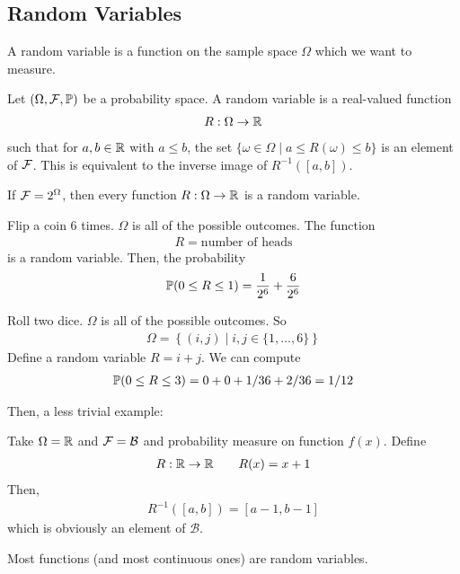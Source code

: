 \subsection{Random Variables}
A random variable is a function on the sample space $\Omega$ which we want to measure.
\begin{definition}
    Let $(\Omega, \mathcal{F}, \mathbb{P})$ be a probability space. A random variable is a real-valued function
    \begin{align}
        R: \Omega \to \mathbb{R}
    \end{align}
    such that for $a,b\in\mathbb{R}$ with $a\le b$, the set $\{ \omega \in \Omega \mid a \le R(\omega) \le b \}$ is an element of $\mathcal{F}$. This is equivalent to the inverse image of $R^{-1}([a,b])$.
\end{definition}
\begin{proposition}
    If $\mathcal{F} = 2^\Omega$, then every function $R: \Omega \to \mathbb{R}$ is a random variable.
\end{proposition}
\begin{example}
    Flip a coin 6 times. $\Omega$ is all of the possible outcomes. The function
    \begin{align}
        R = \text{number of heads}
    \end{align}
    is a random variable. Then, the probability
    \begin{align}
        \mathbb{P}(0 \le R \le 1) = \frac{1}{2^6} + \frac{6}{2^6}
    \end{align}
\end{example}
\begin{example}
    Roll two dice. $\Omega$ is all of the possible outcomes. So
    \begin{align}
        \Omega = \left\{ (i,j) \mid i, j \in \{ 1, \ldots, 6 \} \right\}
    \end{align}
    Define a random variable $R = i + j$. We can compute
    \begin{align}
        \mathbb{P}(0 \le R \le 3) = 0 + 0 + 1/36 + 2/36 = 1/12
    \end{align}
\end{example}
Then, a less trivial example:
\begin{example}
    Take $\Omega = \mathbb{R}$ and $\mathcal{F} = \mathcal{B}$ and probability measure on function $f(x)$. Define
    \begin{align}
        R: \real \to \real \qsp R(x) = x + 1
    \end{align}
    Then,
    \begin{align}
        R^{-1}([a,b]) = [a-1,b-1]
    \end{align}
    which is obviously an element of $\mathcal{B}$.
\end{example}
Most functions (and most continuous ones) are random variables.
